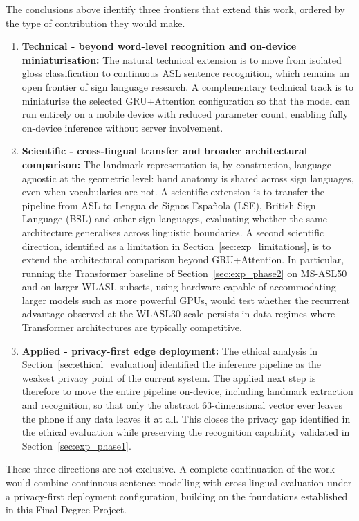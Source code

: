 The conclusions above identify three frontiers that extend this work, ordered by the type of
contribution they would make.
\begin{enumerate}
    \item \textbf{Technical - beyond word-level recognition and on-device miniaturisation:}
          The natural technical extension is to move from isolated gloss classification to continuous ASL
          sentence recognition, which remains an open frontier of sign language research. A complementary
          technical track is to miniaturise the selected GRU+Attention configuration so that the model can
          run entirely on a mobile device with reduced parameter count, enabling fully on-device inference
          without server involvement.

    \item \textbf{Scientific - cross-lingual transfer and broader architectural comparison:}
          The landmark representation is, by construction, language-agnostic at the geometric level: hand
          anatomy is shared across sign languages, even when vocabularies are not. A scientific extension is
          to transfer the pipeline from ASL to Lengua de Signos Espa\~nola (LSE), British Sign Language (BSL)
          and other sign languages, evaluating whether the same architecture generalises across linguistic
          boundaries. A second scientific direction, identified as a limitation in
          Section~\ref{sec:exp_limitations}, is to extend the architectural comparison beyond GRU+Attention.
          In particular, running the Transformer baseline of Section~\ref{sec:exp_phase2} on MS-ASL50 and on
          larger WLASL subsets, using hardware capable of accommodating larger models such as more powerful
          GPUs, would test whether the recurrent advantage observed at the WLASL30 scale persists in data
          regimes where Transformer architectures are typically competitive.

    \item \textbf{Applied - privacy-first edge deployment:} The ethical analysis in Section~\ref{sec:ethical_evaluation} identified the inference pipeline as the weakest privacy point of
          the current system. The applied next step is therefore to move the entire pipeline on-device,
          including landmark extraction and recognition, so that only the abstract 63-dimensional vector ever
          leaves the phone if any data leaves it at all. This closes the privacy gap identified in the
          ethical evaluation while preserving the recognition capability validated in Section~\ref{sec:exp_phase1}.
\end{enumerate}
These three directions are not exclusive. A complete continuation of the work would combine
continuous-sentence modelling with cross-lingual evaluation under a privacy-first deployment
configuration, building on the foundations established in this Final Degree Project.
